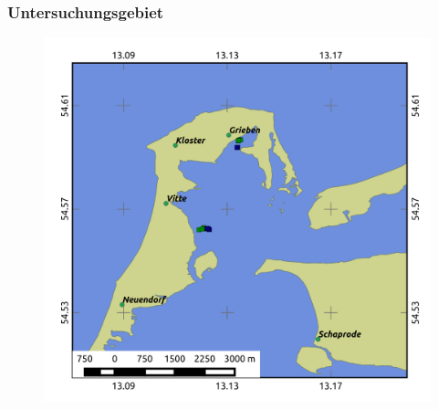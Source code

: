 \documentclass[xcolor=dvipsnames]{beamer}
\begin{document}
\begin{frame}
\frametitle{Untersuchungsgebiet}
\begin{figure}
\includegraphics[height=0.8\textheight]{images/Hiddensee.png}
\end{figure}
\end{frame}
\end{document}
